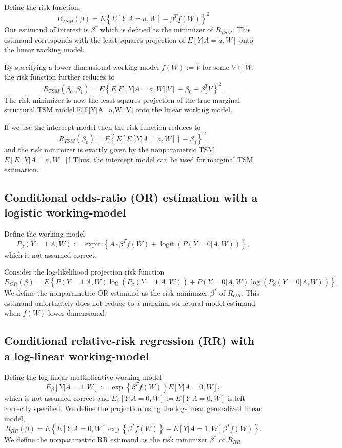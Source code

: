 \documentclass{article}
\DeclareMathOperator{\logit}{logit}
\DeclareMathOperator{\expit}{expit}
\begin{document}
Define the risk function,
$$R_{TSM}(\beta) = E \left\{E[Y|A=a,W] -  \beta^T \underline{f}(W) \right\}^2$$
Our estimand of interest is $\beta^*$ which is defined as the minimizer of $R_{TSM}$. This estimand corresponds with the least-squares projection of $E[Y|A=a,W]$ onto the linear working model.

By specifying a lower dimensional working model $\underline{f}(W) := V$ for some $V \subset W$, the risk function further reduces to
$$R_{TSM}(\beta_0, \beta_1) = E \left\{E[E[Y|A=a,W]|V] - \beta_0 - \beta_1^T V \right\}^2.$$
The risk minimizer is now the least-squares projection of the true marginal structural TSM model E[E[Y|A=a,W]|V] onto the linear working model.


If we use the intercept model then the risk function reduces to
$$R_{TSM}(\beta_0) = E \left\{E[E[Y|A=a,W]] - \beta_0  \right\}^2.$$
and the risk minimizer is exactly given by the nonparametric TSM $E[E[Y|A=a,W]]$! Thus, the intercept model can be used for marginal TSM estimation.


\subsection{Conditional odds-ratio (OR) estimation with a logistic working-model}
Define the working model
$$P_{\beta}(Y=1|A,W) := \expit\left\{A \cdot \beta^T \underline{f}(W) + \logit(P(Y=0|A,W))\right\},$$
which is not assumed correct.

Consider the log-likelihood projection risk function
$$R_{OR}(\beta) = E \left\{P(Y=1|A,W)\log(P_{\beta}(Y=1|A,W)) + P(Y=0|A,W)\log(P_{\beta}(Y=0|A,W)) \right\}.$$
We define the nonparametric OR estimand as the risk minimizer $\beta^*$ of $R_{OR}$. This estimand unfortnately does not reduce to a marginal structural model estimand when $\underline{f}(W)$ lower dimensional.
 
\subsection{Conditional relative-risk regression (RR) with a log-linear working-model}
Define the log-linear multiplicative working model
$$E_{\beta}[Y|A=1,W] := \exp\left\{\beta^T \underline{f}(W) \right\}E[Y|A=0,W],$$
which is not assumed correct and $E_{\beta}[Y|A=0,W] := E[Y|A=0,W]$ is left correctly specified. We define the projection using the log-linear generalized linear model,
$$R_{RR}(\beta) = E \left\{E[Y|A=0,W] \exp\left\{ \beta^T \underline{f}(W)\right\}  -  E[Y|A=1,W]  \beta^T \underline{f}(W)\right\}.$$
We define the nonparametric RR estimand as the risk minimizer $\beta^*$ of $R_{RR}$. 
\end{document}
